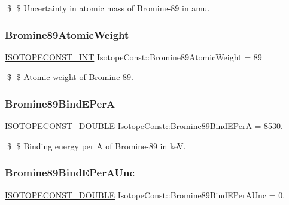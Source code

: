 \$ \$ Uncertainty in atomic mass of Bromine-\/89 in amu. \mbox{\label{group___isotope_const-_bromine-_br89_ga046204d3083540905bb98360ebcd1af6}} 
\subsubsection{\texorpdfstring{Bromine89\+Atomic\+Weight}{Bromine89AtomicWeight}}
{\footnotesize\ttfamily \mbox{\hyperlink{group___isotope_const-_macros_ga5f18360b3e99483a35c32d789e62621c}{I\+S\+O\+T\+O\+P\+E\+C\+O\+N\+S\+T\+\_\+\+I\+NT}} Isotope\+Const\+::\+Bromine89\+Atomic\+Weight = 89}

\$ \$ Atomic weight of Bromine-\/89. \mbox{\label{group___isotope_const-_bromine-_br89_ga6157fa0ec37326128a94528e182b566c}} 
\subsubsection{\texorpdfstring{Bromine89\+Bind\+E\+PerA}{Bromine89BindEPerA}}
{\footnotesize\ttfamily \mbox{\hyperlink{group___isotope_const-_macros_ga8f45a7272ce02c0b4c65c44636ed719a}{I\+S\+O\+T\+O\+P\+E\+C\+O\+N\+S\+T\+\_\+\+D\+O\+U\+B\+LE}} Isotope\+Const\+::\+Bromine89\+Bind\+E\+PerA = 8530.}

\$ \$ Binding energy per A of Bromine-\/89 in keV. \mbox{\label{group___isotope_const-_bromine-_br89_gad01ddcf13d36082ff74f7aed56db8919}} 
\subsubsection{\texorpdfstring{Bromine89\+Bind\+E\+Per\+A\+Unc}{Bromine89BindEPerAUnc}}
{\footnotesize\ttfamily \mbox{\hyperlink{group___isotope_const-_macros_ga8f45a7272ce02c0b4c65c44636ed719a}{I\+S\+O\+T\+O\+P\+E\+C\+O\+N\+S\+T\+\_\+\+D\+O\+U\+B\+LE}} Isotope\+Const\+::\+Bromine89\+Bind\+E\+Per\+A\+Unc = 0.}

